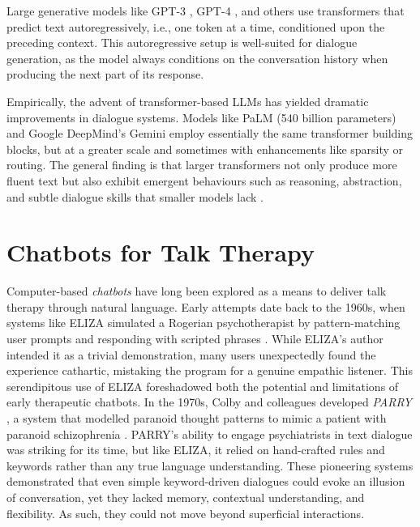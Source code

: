 
Large generative models like GPT-3 \cite{brown2020language}, GPT-4 \cite{openai2023gpt4}, and others use transformers that predict text autoregressively, i.e., one token at a time, conditioned upon the preceding context. This autoregressive setup is well-suited for dialogue generation, as the model always conditions on the conversation history when producing the next part of its response.


Empirically, the advent of transformer-based LLMs has yielded dramatic improvements in dialogue systems. Models like PaLM \cite{chowdhery2022palm} (540 billion parameters) and Google DeepMind's Gemini \cite{geminiteam2025geminifamilyhighlycapable} employ essentially the same transformer building blocks, but at a greater scale and sometimes with enhancements like sparsity or routing. The general finding is that larger transformers not only produce more fluent text but also exhibit emergent behaviours such as reasoning, abstraction, and subtle dialogue skills that smaller models lack \cite{52065,berti2025emergentabilitieslargelanguage}.


\section{Chatbots for Talk Therapy}
Computer-based \emph{chatbots} have long been explored as a means to deliver talk therapy through natural language. Early attempts date back to the 1960s, when systems like ELIZA simulated a Rogerian psychotherapist by pattern-matching user prompts and responding with scripted phrases \cite{Weizenbaum1966}. While ELIZA's author intended it as a trivial demonstration, many users unexpectedly found the experience cathartic, mistaking the program for a genuine empathic listener. This serendipitous use of ELIZA foreshadowed both the potential and limitations of early therapeutic chatbots. In the 1970s, Colby and colleagues developed \emph{PARRY} \cite{10.5555/212154.212175}, a system that modelled paranoid thought patterns to mimic a patient with paranoid schizophrenia \cite{Colby1971}. PARRY's ability to engage psychiatrists in text dialogue was striking for its time, but like ELIZA, it relied on hand-crafted rules and keywords rather than any true language understanding. These pioneering systems demonstrated that even simple keyword-driven dialogues could evoke an illusion of conversation, yet they lacked memory, contextual understanding, and flexibility. As such, they could not move beyond superficial interactions.


